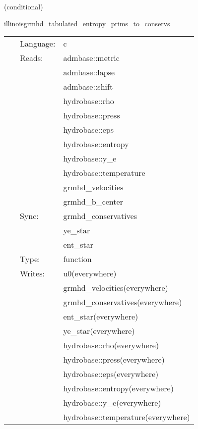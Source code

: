    (conditional) 

\hspace{5mm} illinoisgrmhd\_tabulated\_entropy\_prims\_to\_conservs 

\hspace{5mm}{\it entropy+tabulated version of illinoisgrmhd\_prims\_to\_conservs } 


\hspace{5mm}

 \begin{tabular*}{160mm}{cll} 
~ & Language:  & c \\ 
~ & Reads:  & admbase::metric \\ 
~& ~ &admbase::lapse\\ 
~& ~ &admbase::shift\\ 
~& ~ &hydrobase::rho\\ 
~& ~ &hydrobase::press\\ 
~& ~ &hydrobase::eps\\ 
~& ~ &hydrobase::entropy\\ 
~& ~ &hydrobase::y\_e\\ 
~& ~ &hydrobase::temperature\\ 
~& ~ &grmhd\_velocities\\ 
~& ~ &grmhd\_b\_center\\ 
~ & Sync:  & grmhd\_conservatives \\ 
~& ~ &ye\_star\\ 
~& ~ &ent\_star\\ 
~ & Type:  & function \\ 
~ & Writes:  & u0(everywhere) \\ 
~& ~ &grmhd\_velocities(everywhere)\\ 
~& ~ &grmhd\_conservatives(everywhere)\\ 
~& ~ &ent\_star(everywhere)\\ 
~& ~ &ye\_star(everywhere)\\ 
~& ~ &hydrobase::rho(everywhere)\\ 
~& ~ &hydrobase::press(everywhere)\\ 
~& ~ &hydrobase::eps(everywhere)\\ 
~& ~ &hydrobase::entropy(everywhere)\\ 
~& ~ &hydrobase::y\_e(everywhere)\\ 
~& ~ &hydrobase::temperature(everywhere)\\ 
\end{tabular*} 


\vspace{5mm}

